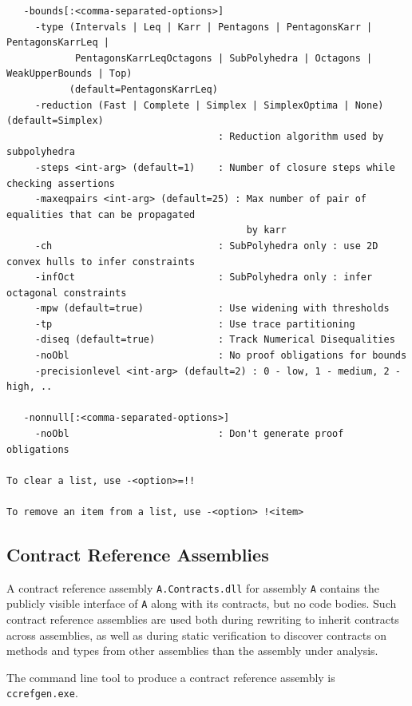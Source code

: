 \documentclass{article}
\newcommand{\code}[1]{\lstinline{#1}}
\begin{document}
{\begin{verbatim}
   -bounds[:<comma-separated-options>]
     -type (Intervals | Leq | Karr | Pentagons | PentagonsKarr | PentagonsKarrLeq | 
            PentagonsKarrLeqOctagons | SubPolyhedra | Octagons | WeakUpperBounds | Top)
           (default=PentagonsKarrLeq)
     -reduction (Fast | Complete | Simplex | SimplexOptima | None) (default=Simplex) 
                                     : Reduction algorithm used by subpolyhedra
     -steps <int-arg> (default=1)    : Number of closure steps while checking assertions
     -maxeqpairs <int-arg> (default=25) : Max number of pair of equalities that can be propagated 
                                          by karr
     -ch                             : SubPolyhedra only : use 2D convex hulls to infer constraints
     -infOct                         : SubPolyhedra only : infer octagonal constraints
     -mpw (default=true)             : Use widening with thresholds
     -tp                             : Use trace partitioning
     -diseq (default=true)           : Track Numerical Disequalities
     -noObl                          : No proof obligations for bounds
     -precisionlevel <int-arg> (default=2) : 0 - low, 1 - medium, 2 - high, ..

   -nonnull[:<comma-separated-options>]
     -noObl                          : Don't generate proof obligations

To clear a list, use -<option>=!!

To remove an item from a list, use -<option> !<item>
\end{verbatim}
}

\subsection{Contract Reference Assemblies}
\label{sec:contractreferenceassemblies-appendix}
A contract reference assembly \code{A.Contracts.dll} for assembly
\code{A} contains the publicly visible interface of \code{A} along
with its contracts, but no code bodies. Such contract reference
assemblies are used both during rewriting to inherit contracts across
assemblies, as well as during static verification to discover
contracts on methods and types from other assemblies than the assembly
under analysis.

The command line tool to produce a contract reference assembly is
\code{ccrefgen.exe}.
\end{document}
